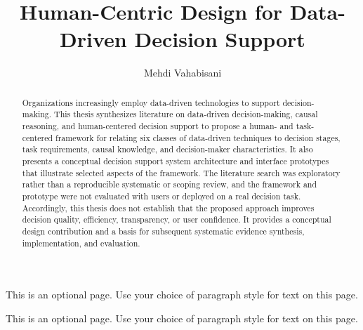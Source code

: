 \documentclass{sfuthesis}
\title{Human-Centric Design for Data-Driven Decision Support}
\author{Mehdi Vahabisani}
\begin{document}
\frontmatter
\maketitle{}
\makecommittee{}


\begin{abstract}
Organizations increasingly employ data-driven technologies to support decision-making. This thesis synthesizes literature on data-driven decision-making, causal reasoning, and human-centered decision support to propose a human- and task-centered framework for relating six classes of data-driven techniques to decision stages, task requirements, causal knowledge, and decision-maker characteristics. It also presents a conceptual decision support system architecture and interface prototypes that illustrate selected aspects of the framework. The literature search was exploratory rather than a reproducible systematic or scoping review, and the framework and prototype were not evaluated with users or deployed on a real decision task. Accordingly, this thesis does not establish that the proposed approach improves decision quality, efficiency, transparency, or user confidence. It provides a conceptual design contribution and a basis for subsequent systematic evidence synthesis, implementation, and evaluation.
\end{abstract}


\begin{dedication}
This is an optional page. Use your choice of paragraph style for text on this page.
\end{dedication}


\begin{acknowledgements}
This is an optional page. Use your choice of paragraph style for text on this page.
\end{acknowledgements}

%
\tableofcontents%
\clearpage

%
\listoftables%
\clearpage

%
\listoffigures%
\clearpage
\end{document}
